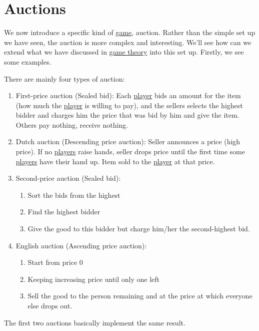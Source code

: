 
\chapter{Auctions}\label{ch:auctions}
We now introduce a specific kind of \hyperref[def:mathematical-Bayesian-game]{game}, auction. Rather than the simple set up we have seen, the auction is more complex and interesting. We'll see how can we extend what we have discussed in \hyperref[ch:game-theory]{game theory} into this set up. Firstly, we see some examples.

\begin{eg}[Auctions]
	There are mainly four types of auction:
	\begin{enumerate}
		\item\label{eg:first-price-auction} First-price auction (Sealed bid): Each \hyperref[def:player]{player} bids an amount for the item (how much the \hyperref[def:player]{player} is willing to pay), and the sellers selects the highest bidder and charges him the price that was bid by him and give the item. Others pay nothing, receive nothing.
		\item\label{eg:Dutch-auction} Dutch auction (Descending price auction): Seller announces a price (high price). If no \hyperref[def:player]{players} raise hands, seller drops price until the first time some \hyperref[def:player]{players} have their hand up. Item sold to the \hyperref[def:player]{player} at that price.
		\item\label{eg:second-price-auction} Second-price auction (Sealed bid):
		\begin{enumerate}
			\item Sort the bids from the highest
			\item Find the highest bidder
			\item Give the good to this bidder but charge him/her the second-highest bid.
		\end{enumerate}
		\item\label{eg:English-auction} English auction (Ascending price auction):
		\begin{enumerate}
			\item Start from price \(0\)
			\item Keeping increasing price until only one left
			\item Sell the good to the person remaining and at the price at which everyone else drops out.
		\end{enumerate}
	\end{enumerate}
\end{eg}
\begin{remark}
	The first two auctions basically implement the same result.
\end{remark}

